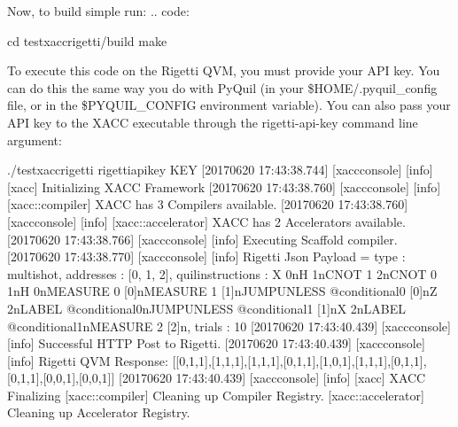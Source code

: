 \documentclass[letterpaper,10pt,english]{sphinxmanual}
\begin{document}
Now, to build simple run:
.. code:

\begin{sphinxVerbatim}[commandchars=\\\{\}]
\PYGZdl{} cd test\PYGZhy{}xacc\PYGZhy{}rigetti/build
\PYGZdl{} make
\end{sphinxVerbatim}

To execute this code on the Rigetti QVM, you must provide your API key. You can do this
the same way you do with PyQuil (in your \$HOME/.pyquil\_config file, or in the \$PYQUIL\_CONFIG
environment variable). You can also pass your API key to the XACC executable through the
\textendash{}rigetti-api-key command line argument:

\begin{sphinxVerbatim}[commandchars=\\\{\}]
\PYGZdl{} ./test\PYGZhy{}xacc\PYGZhy{}rigetti \PYGZhy{}\PYGZhy{}rigetti\PYGZhy{}api\PYGZhy{}key KEY
[2017\PYGZhy{}06\PYGZhy{}20 17:43:38.744] [xacc\PYGZhy{}console] [info] [xacc] Initializing XACC Framework
[2017\PYGZhy{}06\PYGZhy{}20 17:43:38.760] [xacc\PYGZhy{}console] [info] [xacc::compiler] XACC has 3 Compilers available.
[2017\PYGZhy{}06\PYGZhy{}20 17:43:38.760] [xacc\PYGZhy{}console] [info] [xacc::accelerator] XACC has 2 Accelerators available.
[2017\PYGZhy{}06\PYGZhy{}20 17:43:38.766] [xacc\PYGZhy{}console] [info] Executing Scaffold compiler.
[2017\PYGZhy{}06\PYGZhy{}20 17:43:38.770] [xacc\PYGZhy{}console] [info] Rigetti Json Payload = \PYGZob{} \PYGZdq{}type\PYGZdq{} : \PYGZdq{}multishot\PYGZdq{}, \PYGZdq{}addresses\PYGZdq{} : [0, 1, 2], \PYGZdq{}quil\PYGZhy{}instructions\PYGZdq{} : \PYGZdq{}X 0\PYGZbs{}nH 1\PYGZbs{}nCNOT 1 2\PYGZbs{}nCNOT 0 1\PYGZbs{}nH 0\PYGZbs{}nMEASURE 0 [0]\PYGZbs{}nMEASURE 1 [1]\PYGZbs{}nJUMP\PYGZhy{}UNLESS @conditional\PYGZus{}0 [0]\PYGZbs{}nZ 2\PYGZbs{}nLABEL @conditional\PYGZus{}0\PYGZbs{}nJUMP\PYGZhy{}UNLESS @conditional\PYGZus{}1 [1]\PYGZbs{}nX 2\PYGZbs{}nLABEL @conditional\PYGZus{}1\PYGZbs{}nMEASURE 2 [2]\PYGZbs{}n\PYGZdq{}, \PYGZdq{}trials\PYGZdq{} : 10 \PYGZcb{}
[2017\PYGZhy{}06\PYGZhy{}20 17:43:40.439] [xacc\PYGZhy{}console] [info] Successful HTTP Post to Rigetti.
[2017\PYGZhy{}06\PYGZhy{}20 17:43:40.439] [xacc\PYGZhy{}console] [info] Rigetti QVM Response:
[[0,1,1],[1,1,1],[1,1,1],[0,1,1],[1,0,1],[1,1,1],[0,1,1],[0,1,1],[0,0,1],[0,0,1]]
[2017\PYGZhy{}06\PYGZhy{}20 17:43:40.439] [xacc\PYGZhy{}console] [info]
[xacc] XACC Finalizing
[xacc::compiler] Cleaning up Compiler Registry.
[xacc::accelerator] Cleaning up Accelerator Registry.
\end{sphinxVerbatim}
\end{document}
